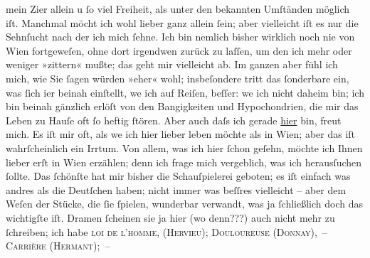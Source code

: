 \begin{ledgroupsized}[t]{13cm}
               mein Zi{\geminationm}er allein u ſo viel Freiheit, als unter den
               bekannten Umſtänden möglich iſt. Manchmal möcht ich wohl lieber ganz allein ſein;
               aber vielleicht iſt {\pb}es nur die Sehnſucht nach der ich
               mich ſehne. Ich bin nemlich bisher wirklich noch nie von Wien fortgeweſen, ohne dort irgendwen zurück zu laſſen, um den
               ich mehr oder weniger »zittern« mußte; das geht mir vielleicht ab. Im ganzen aber
               fühl ich mich, wie Sie ſagen würden »eher« wohl; insbeſondere tritt das ſonderbare
               ein, was ſich i{\geminationm}er beinah einſtellt, we{\geminationn} ich auf Reiſen, beſſer: we{\geminationn} ich nicht daheim bin; ich bin beinah gänzlich erlöſt von den Bangigkeiten und
               Hypochondrien, die mir das Leben zu Hauſe oft ſo heftig ſtören. Aber \introOben{}auch\introOben{} daſs ich gerade \uline{hier} bin,
               freut mich. Es iſt mir oft, als we{\geminationn} ich hier lieber
               leben möchte als in Wien; aber das iſt
                  wahrſchein{\pb}lich ein Irrtum. Von allem, was ich hier
               ſchon geſehn, möchte ich Ihnen lieber erſt in Wien
               erzählen; denn ich frage mich vergeblich, was ich herausſuchen ſollte. Das ſchönſte
               hat mir bisher die Schauſpielerei geboten; es iſt einfach was andres als die
               Deutſchen haben; nicht immer was beſſres vielleicht – aber dem Weſen der Stücke, die
               ſie ſpielen, wunderbar verwandt, was ja ſchließlich doch das wichtigſte iſt. Dramen
               ſcheinen sie ja hier (wo denn???) auch nicht mehr zu ſchreiben; ich habe \textsc{loi de l’homme, (Hervieu); Douloureuse
                     (Donnay), – Carrière (Hermant); –
}
\end{ledgroupsized}
